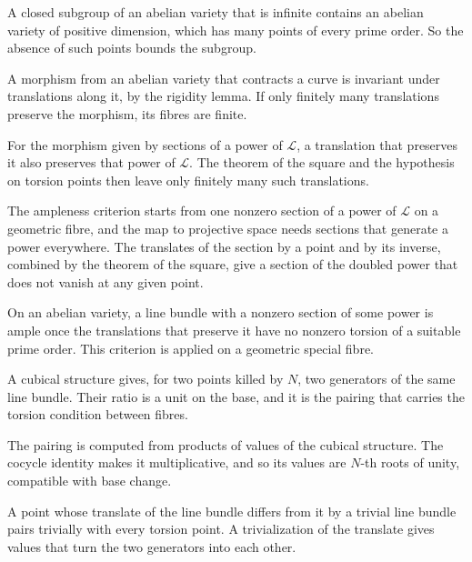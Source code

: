 A closed subgroup of an abelian variety that is infinite contains an abelian variety of positive dimension, which
has many points of every prime order. So the absence of such points bounds the subgroup.

A morphism from an abelian variety that contracts a curve is invariant under translations along it, by the
rigidity lemma. If only finitely many translations preserve the morphism, its fibres are finite.

For the morphism given by sections of a power of $\mathcal L$, a translation that preserves it also preserves that
power of $\mathcal L$. The theorem of the square and the hypothesis on torsion points then leave only finitely many
such translations.

The ampleness criterion starts from one nonzero section of a power of $\mathcal L$ on a geometric fibre, and the map
to projective space needs sections that generate a power everywhere. The translates of the section by a point and
by its inverse, combined by the theorem of the square, give a section of the doubled power that does not vanish at
any given point.

On an abelian variety, a line bundle with a nonzero section of some power is ample once the translations that
preserve it have no nonzero torsion of a suitable prime order. This criterion is applied on a geometric special
fibre.

A cubical structure gives, for two points killed by $N$, two generators of the same line bundle. Their ratio is a
unit on the base, and it is the pairing that carries the torsion condition between fibres.

The pairing is computed from products of values of the cubical structure. The cocycle identity makes it
multiplicative, and so its values are $N$-th roots of unity, compatible with base change.

A point whose translate of the line bundle differs from it by a trivial line bundle pairs trivially with every
torsion point. A trivialization of the translate gives values that turn the two generators into each other.


